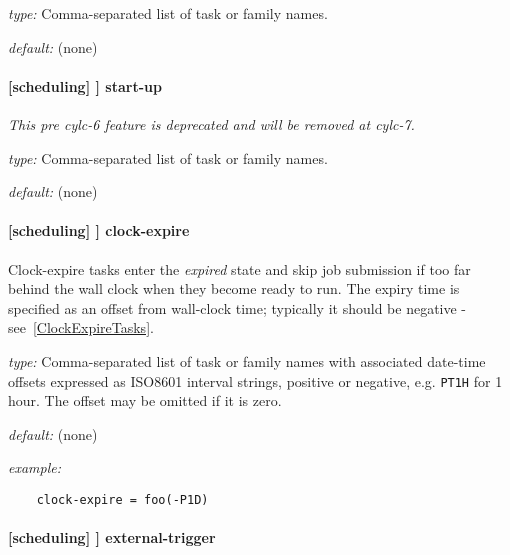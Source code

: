 \begin{myitemize}
    \item {\em type:} Comma-separated list of task or family names.
    \item {\em default:} (none)
\end{myitemize}

\paragraph[start-up]{[scheduling] \textrightarrow [[special tasks]] \textrightarrow start-up}

{\em This pre cylc-6 feature is deprecated and will be removed at cylc-7.}

\begin{myitemize}
    \item {\em type:} Comma-separated list of task or family names.
    \item {\em default:} (none)
\end{myitemize}

\paragraph[clock-expire]{[scheduling] \textrightarrow [[special tasks]] \textrightarrow clock-expire}
\label{ClockExpireRef}

Clock-expire tasks enter the {\em expired} state and skip job submission if too
far behind the wall clock when they become ready to run.  The expiry time is
specified as an offset from wall-clock time; typically it should be negative -
see~\ref{ClockExpireTasks}.

\begin{myitemize}
    \item {\em type:} Comma-separated list of task or family names with
        associated date-time offsets expressed as ISO8601 interval strings,
        positive or negative, e.g. \lstinline=PT1H= for 1 hour.  The offset
        may be omitted if it is zero.
    \item {\em default:} (none)
    \item {\em example:}
\begin{lstlisting}
    clock-expire = foo(-P1D)
\end{lstlisting}
\end{myitemize}

\paragraph[external-trigger]{[scheduling] \textrightarrow [[special tasks]] \textrightarrow external-trigger}

